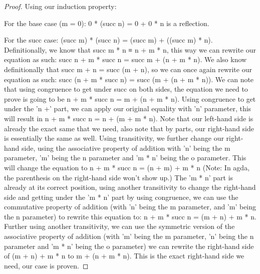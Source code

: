 \begin{proof}
  Using our induction property:

  For the base case (m = 0): 0 * (succ n) = 0 + 0 * n is a reflection.

  For the succ case: (succ m) * (succ n) = (succ m) + ((succ m) * n). Definitionally, we know that succ m * n ≡ n + m * n, this way we can rewrite our equation as such: succ n + m * succ n = succ m + (n + m * n). We also know definitionally that succ m + n = succ (m + n), so we can once again rewrite our equation as such: succ (n + m * succ n) = succ (m + (n + m * n)). We can note that using congruence to get under succ on both sides, the equation we need to prove is going to be n + m * succ n = m + (n + m * n). Using congruence to get under the 'n +' part, we can apply our original equality with 'n' parameter, this will result in n + m * succ n = n + (m + m * n). Note that our left-hand side is already the exact same that we need, also note that by parts, our right-hand side is essentially the same as well. Using transitivity, we further change our right-hand side, using the associative property of addition with 'n' being the m parameter, 'm' being the n parameter and 'm * n' being the o parameter. This will change the equation to n + m * succ n = (n + m) + m * n (Note: In agda, the parenthesis on the right-hand side won't show up.) The 'm * n' part is already at its correct position, using another transitivity to change the right-hand side and getting under the 'm * n' part by using congruence, we can use the commutative property of addition (with 'n' being the m parameter, and 'm' being the n parameter) to rewrite this equation to: n + m * succ n = (m + n) + m * n. Further using another transitivity, we can use the symmetric version of the associative property of addition (with 'm' being the m parameter, 'n' being the n parameter and 'm * n' being the o parameter) we can rewrite the right-hand side of (m + n) + m * n to m + (n + m * n). This is the exact right-hand side we need, our case is proven.


\end{proof}
